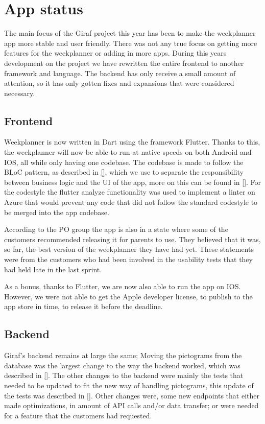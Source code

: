 \section{App status}
The main focus of the Giraf project this year has been to make the weekplanner app more stable and user friendly.
There was not any true focus on getting more features for the weekplanner or adding in more apps.
During this years development on the project we have rewritten the entire frontend to another framework and language.
The backend has only receive a small amount of attention, so it has only gotten fixes and expansions that were considered necessary.

\subsection{Frontend}
Weekplanner is now written in Dart using the framework Flutter.
Thanks to this, the weekplanner will now be able to run at native speeds on both Android and IOS, all while only having one codebase.
The codebase is made to follow the BLoC pattern, as described in \autoref{}, which we use to separate the responsibility between business logic and the UI of the app, more on this can be found in \autoref{}. 
For the codestyle the flutter analyze functionality was used to implement a linter on Azure that would prevent any code that did not follow the standard codestyle to be merged into the app codebase.

According to the PO group the app is also in a state where some of the customers recommended releasing it for parents to use.
They believed that it was, so far, the best version of the weekplanner they have had yet.
These statements were from the customers who had been involved in the usability tests that they had held late in the last sprint.

As a bonus, thanks to Flutter, we are now also able to run the app on IOS.
However, we were not able to get the Apple developer license, to publish to the app store in time, to release it before the deadline.


\subsection{Backend}
Giraf's backend remains at large the same; Moving the pictograms from the database was the largest change to the way the backend worked, which was described in \autoref{}.
The other changes to the backend were mainly the tests that needed to be updated to fit the new way of handling pictograms, this update of the tests was described in \autoref{}.
Other changes were, some new endpoints that either made optimizations, in amount of API calls and/or data transfer; or were needed for a feature that the customers had requested.

